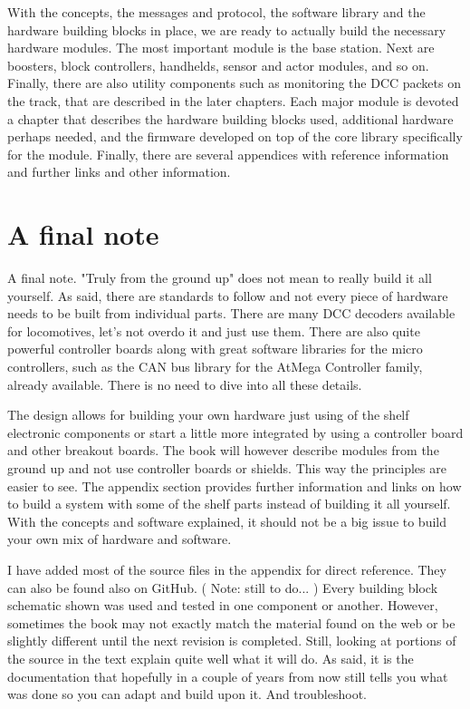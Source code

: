 With the concepts, the messages and protocol, the software library and the hardware building blocks in place, we are ready to actually build the necessary hardware modules. The most important module is the base station. Next are boosters, block controllers, handhelds, sensor and actor modules, and so on. Finally, there are also utility components such as monitoring the DCC packets on the track, that are described in the later chapters. Each major module is devoted a chapter that describes the hardware building blocks used, additional hardware perhaps needed, and the firmware developed on top of the core library specifically for the module. Finally, there are several appendices with reference information and further links and other information.

\section{A final note}

A final note. "Truly from the ground up" does not mean to really build it all yourself. As said, there are standards to follow and not every piece of hardware needs to be built from individual parts. There are many DCC decoders available for locomotives, let's not overdo it and just use them. There are also quite powerful controller boards along with great software libraries for the micro controllers, such as the CAN bus library for the AtMega Controller family, already available. There is no need to dive into all these details.

The design allows for building your own hardware just using of the shelf electronic components or start a little more integrated by using a controller board and other breakout boards. The book will however describe modules from the ground up and not use controller boards or shields. This way the principles are easier to see. The appendix section provides further information and links on how to build a system with some of the shelf parts instead of building it all yourself. With the concepts and software explained, it should not be a big issue to build your own mix of hardware and software.

I have added most of the source files in the appendix for direct reference. They can also be found also on GitHub. ( Note: still to do... ) Every building block schematic shown was used and tested in one component or another. However, sometimes the book may not exactly match the material found on the web or be slightly different until the next revision is completed. Still, looking at portions of the source in the text explain quite well what it will do. As said, it is the documentation that hopefully in a couple of years from now still tells you what was done so you can adapt and build upon it. And troubleshoot.

